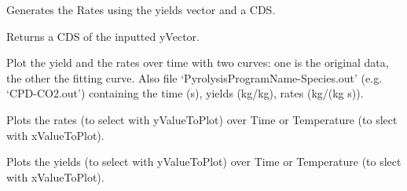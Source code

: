 \documentclass[letterpaper,10pt,english]{sphinxmanual}
\begin{document}
\begin{fulllineitems}
\begin{fulllineitems}
\end{fulllineitems}


\begin{fulllineitems}
\label{FittingClasses:Fit_one_run.Model.calcRate}
Generates the Rates using the yields vector and a CDS.

\end{fulllineitems}


\begin{fulllineitems}
\label{FittingClasses:Fit_one_run.Model.deriveC}
Returns a CDS of the inputted yVector.

\end{fulllineitems}


\begin{fulllineitems}
\label{FittingClasses:Fit_one_run.Model.plot}
Plot the yield and the rates over time with two curves: one is the original data, the other the fitting curve. Also file `PyrolysisProgramName-Species.out' (e.g. `CPD-CO2.out') containing the time (s), yields (kg/kg), rates (kg/(kg s)).

\end{fulllineitems}


\begin{fulllineitems}
\label{FittingClasses:Fit_one_run.Model.pltRate}
Plots the rates (to select with yValueToPlot) over Time or Temperature (to slect with xValueToPlot).

\end{fulllineitems}


\begin{fulllineitems}
\label{FittingClasses:Fit_one_run.Model.pltYield}
Plots the yields (to select with yValueToPlot) over Time or Temperature (to slect with xValueToPlot).


\end{fulllineitems}
\end{fulllineitems}
\end{document}
